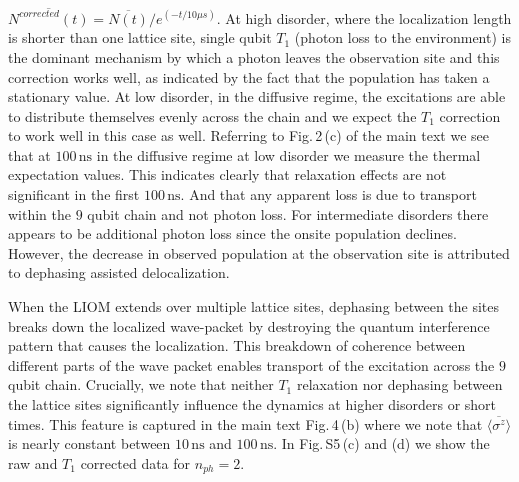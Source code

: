 $\overline{N^{corrected} \left( t \right)} = \overline{N \left( t \right)} / e^{\left( -t/10 \mu s \right) }$.
%
At high disorder, where the localization length is shorter than one lattice site,
single qubit $T_1$ (photon loss to the environment) is the dominant mechanism by which a photon leaves the observation site and this correction works well,
as indicated by the fact that the population has taken a stationary value.
%
At low disorder, in the diffusive regime, the excitations are able to distribute themselves evenly across the chain and we expect the $T_1$ correction to work well in this case as well.
Referring to Fig.\,2\,(c) of the main text we see that at $100 \, \text{ns}$ in the diffusive regime at low disorder we measure the thermal expectation values.
This indicates clearly that relaxation effects are not significant in the first $100 \, \text{ns}$.
And that any apparent loss is due to transport within the $9$ qubit chain and not photon loss.
%
For intermediate disorders there appears to be additional photon loss since the onsite population declines. However, the decrease in observed population at the observation site is attributed to dephasing assisted delocalization. \autocite{Znidaric2015, Levi2016, Fischer2016, Luschen2017, vanNieuwenburg2017}

When the LIOM extends over multiple lattice sites, dephasing between the sites breaks down the localized wave-packet by destroying the quantum interference pattern that causes the localization.
This breakdown of coherence between different parts of the wave packet enables transport of the excitation across the $9$ qubit chain.
Crucially, we note that neither $T_1$ relaxation nor dephasing between the lattice sites significantly influence the dynamics at higher disorders or short times.
This feature is captured in the main text Fig.\,4\,(b) where we note that $\overline{ \langle \sigma^{z} \rangle }$ is nearly constant between $10 \, \text{ns}$ and $100 \, \text{ns}$.
In Fig.\,S5\,(c) and (d) we show the raw and $T_1$ corrected data for $n_{ph}=2$.

